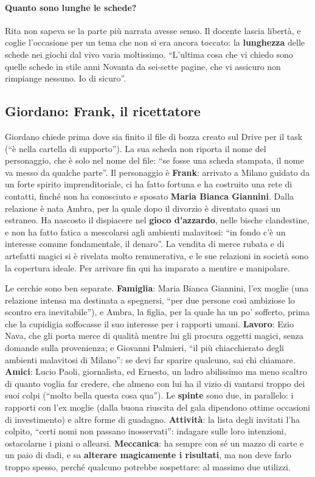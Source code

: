 \paragraph{Quanto sono lunghe le schede?} Rita non sapeva se la parte più narrata
avesse senso. Il docente lascia libertà, e coglie l'occasione per un tema che non
si era ancora toccato: la \textbf{lunghezza} delle schede nei giochi dal vivo varia
moltissimo. ``L'ultima cosa che vi chiedo sono quelle schede in stile anni Novanta
da sei-sette pagine, che vi assicuro non rimpiange nessuno. Io di sicuro''.

\subsection{Giordano: Frank, il ricettatore}

Giordano chiede prima dove sia finito il file di bozza creato sul Drive per il task
(``è nella cartella di supporto''). La sua scheda non riporta il nome del
personaggio, che è solo nel nome del file: ``se fosse una scheda stampata, il nome
va messo da qualche parte''. Il personaggio è \textbf{Frank}: arrivato a Milano
guidato da un forte spirito imprenditoriale, ci ha fatto fortuna e ha costruito
una rete di contatti, finché non ha conosciuto e sposato \textbf{Maria Bianca
Giannini}. Dalla relazione è nata Ambra, per la quale dopo il divorzio è diventato
quasi un estraneo. Ha nascosto il dispiacere nel \textbf{gioco d'azzardo}, nelle
bische clandestine, e non ha fatto fatica a mescolarsi agli ambienti malavitosi:
``in fondo c'è un interesse comune fondamentale, il denaro''. La vendita di merce
rubata e di artefatti magici si è rivelata molto remunerativa, e le sue relazioni
in società sono la copertura ideale. Per arrivare fin qui ha imparato a mentire e
manipolare.

Le cerchie sono ben separate. \textbf{Famiglia}: Maria Bianca Giannini, l'ex
moglie (una relazione intensa ma destinata a spegnersi, ``per due persone così
ambiziose lo scontro era inevitabile''), e Ambra, la figlia, per la quale ha un po'
sofferto, prima che la cupidigia soffocasse il suo interesse per i rapporti umani.
\textbf{Lavoro}: Ezio Nava, che gli porta merce di qualità mentre lui gli procura
oggetti magici, senza domande sulla provenienza; e Giovanni Palmieri, ``il più
chiacchierato degli ambienti malavitosi di Milano'': se devi far sparire qualcuno,
sai chi chiamare. \textbf{Amici}: Lucio Paoli, giornalista, ed Ernesto, un ladro
abilissimo ma meno scaltro di quanto voglia far credere, che almeno con lui ha il
vizio di vantarsi troppo dei suoi colpi (``molto bella questa cosa qua''). Le
\textbf{spinte} sono due, in parallelo: i rapporti con l'ex moglie (dalla buona
riuscita del gala dipendono ottime occasioni di investimento) e altre forme di
guadagno. \textbf{Attività}: la lista degli invitati l'ha colpito, ``certi nomi non
passano inosservati'': indagare sulle loro intenzioni, ostacolarne i piani o
allearsi. \textbf{Meccanica}: ha sempre con sé un mazzo di carte e un paio di dadi,
e sa \textbf{alterare magicamente i risultati}, ma non deve farlo troppo spesso,
perché qualcuno potrebbe sospettare: al massimo due utilizzi.

